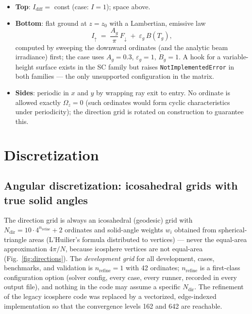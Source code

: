 \documentclass[11pt,a4paper]{article}
\newcommand{\Om}{\Omega}
\begin{document}
\begin{itemize}
\item \textbf{Top}: $I_{\mathrm{diff}}=$ const (case: $I=1$); space above.
\item \textbf{Bottom}: flat ground at $z=z_0$ with a Lambertian, emissive
law
\begin{equation}
I_{\uparrow} \;=\; \frac{A_g}{\pi}\,F_{\downarrow}
\;+\; \varepsilon_g\,B(T_g),
\label{eq:ground}
\end{equation}
computed by sweeping the downward ordinates (and the analytic beam
irradiance) first; the case uses $A_g=0.3$, $\varepsilon_g=1$, $B_g=1$.
A hook for a variable-height surface exists in the SC family but raises
\texttt{NotImplementedError} in both families --- the only unsupported
configuration in the matrix.
\item \textbf{Sides}: periodic in $x$ and $y$ by wrapping ray exit to
entry. No ordinate is allowed exactly $\Om_z=0$ (such ordinates would
form cyclic characteristics under periodicity); the direction grid is
rotated on construction to guarantee this.
\end{itemize}

\section{Discretization}
\label{sec:discretization}

\subsection{Angular discretization: icosahedral grids with true solid angles}
\label{sec:dirs}

The direction grid is always an icosahedral (geodesic) grid with
$N_{\mathrm{dir}}=10\cdot4^{n_{\mathrm{refine}}}+2$ ordinates and
solid-angle weights $w_i$ obtained from spherical-triangle areas
(L'Huilier's formula distributed to vertices) --- never the equal-area
approximation $4\pi/N$, because icosphere vertices are not equal-area
(Fig.~\ref{fig:directions}). The \emph{development grid} for all
development, cases, benchmarks, and validation is
$n_{\mathrm{refine}}=1$ with 42 ordinates; $n_{\mathrm{refine}}$ is a
first-class configuration option (solver config, every case, every runner,
recorded in every output file), and nothing in the code may assume a
specific $N_{\mathrm{dir}}$. The refinement of the legacy icosphere code
was replaced by a vectorized, edge-indexed implementation so that the
convergence levels 162 and 642 are reachable.
\end{document}
